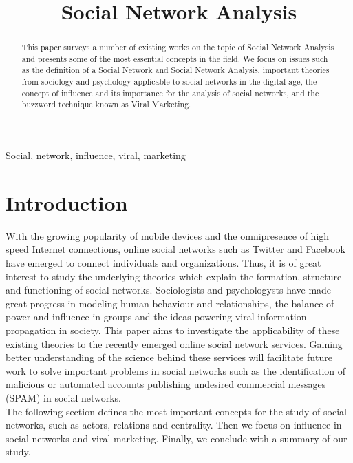 \documentclass[conference,letterpaper]{IEEEtran}
\begin{document}
\title{\huge Social Network Analysis}

\author{
}

\maketitle
\begin{abstract}
This paper surveys a number of existing works on the topic of Social Network Analysis and presents some of the most essential concepts in the field. We focus on issues such as the definition of a Social Network and Social Network Analysis, important theories from sociology and psychology applicable to social networks in the digital age, the concept of influence and its importance for the analysis of social networks, and the buzzword technique known as Viral Marketing.
\\
\end{abstract}

\begin{keywords}
Social, network, influence, viral, marketing
\end{keywords}

\section{Introduction}
With the growing popularity of mobile devices and the omnipresence of high speed Internet connections, online social networks such as Twitter and Facebook have emerged to connect individuals and organizations.
Thus, it is of great interest to study the underlying theories which explain the formation, structure and functioning of social networks. Sociologists and psychologysts have made great progress in modeling human behaviour and relationships, 
the balance of power and influence in groups and the ideas powering viral information propagation in society. This paper aims to investigate the applicability of these existing theories to the recently emerged online social network services.
Gaining better understanding of the science behind these services will facilitate future work to solve important problems in social networks such as the identification of malicious or automated accounts publishing undesired commercial messages (SPAM) in social networks.\\
\indent
The following section defines the most important concepts for the study of social networks, such as actors, relations and centrality.
Then we focus on influence in social networks and viral marketing. Finally, we conclude with a summary of our study.\\
\end{document}
